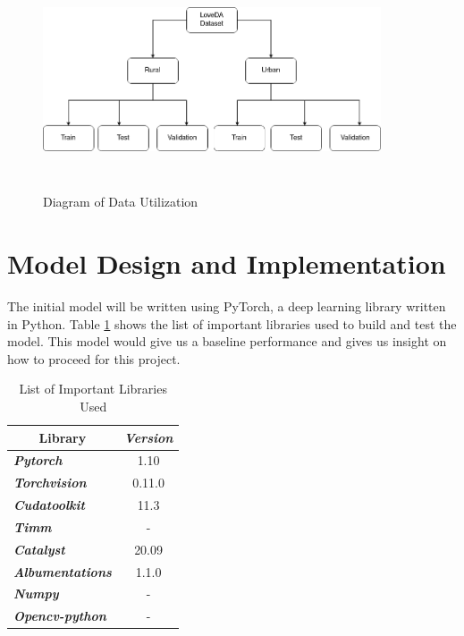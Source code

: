 \FloatBarrier
\begin{figure}[!h]
\includegraphics[width=10.0cm, height=6.5cm]{images/loveda-chart.png}
\centering
\caption{Diagram of Data Utilization}
\label{fig:data-uti}
\end{figure}
\FloatBarrier






\section{Model Design and Implementation}

The initial model will be written using PyTorch, a deep learning library written in Python. Table \ref{tab:libraries} shows the list of important libraries used to build and test the model. This model would give us a baseline performance and gives us insight on how to proceed for this project.

\begin{table}[]
\centering
\begin{tabular}{|l|c|}
\hline
\multicolumn{1}{|c|}{\textbf{Library}} & \textit{\textbf{Version}} \\ \hline
\textit{\textbf{Pytorch}}              & 1.10                      \\ \hline
\textit{\textbf{Torchvision}}          & 0.11.0                    \\ \hline
\textit{\textbf{Cudatoolkit}}          & 11.3                      \\ \hline
\textit{\textbf{Timm}}                 & -                         \\ \hline
\textit{\textbf{Catalyst}}             & 20.09                     \\ \hline
\textit{\textbf{Albumentations}}       & 1.1.0                     \\ \hline
\textit{\textbf{Numpy}}                & -                         \\ \hline
\textit{\textbf{Opencv-python}}       & -                         \\ \hline
\end{tabular}
\caption{List of Important Libraries Used}
\label{tab:libraries}
\end{table}

